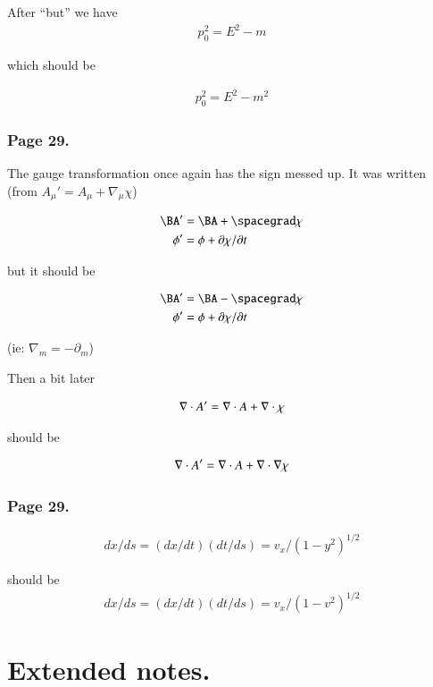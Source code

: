 After ``but'' we have
\begin{align*}
p_0^2 = E^2 - m
\end{align*}

which should be

\begin{align*}
p_0^2 = E^2 - m^2
\end{align*}

\subsubsection{Page 29.}

The gauge transformation once again has the sign messed up.  It was written (from ${A_\mu}' = A_\mu + \nabla_\mu \chi$)

\begin{align*}
\BA' &= \BA + \spacegrad \chi \\
\phi' &= \phi + {\partial \chi}/{\partial t}
\end{align*}

but it should be

\begin{align*}
\BA' &= \BA - \spacegrad \chi \\
\phi' &= \phi + {\partial \chi}/{\partial t}
\end{align*}

(ie: $\nabla_m = -\partial_m$)

Then a bit later

\begin{align*}
\nabla \cdot A' = \nabla \cdot A + \nabla \cdot \chi
\end{align*}

should be

\begin{align*}
\nabla \cdot A' = \nabla \cdot A + \nabla \cdot \nabla \chi
\end{align*}

\subsubsection{Page 29.}

\begin{align*}
dx/ds = (dx/dt)(dt/ds) = v_x/(1-y^2)^{1/2}
\end{align*}

should be
\begin{align*}
dx/ds = (dx/dt)(dt/ds) = v_x/(1-v^2)^{1/2}
\end{align*}

\section{Extended notes.}

